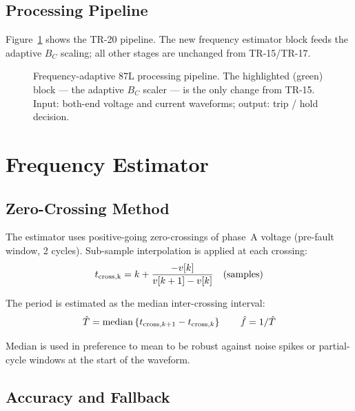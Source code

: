 \documentclass[11pt, a4paper]{article}
\begin{document}
\subsection{Processing Pipeline}

Figure~\ref{fig:pipeline} shows the TR-20 pipeline.  The new frequency
estimator block feeds the adaptive $B_C$ scaling; all other stages are
unchanged from TR-15/TR-17.

\begin{figure}[h]
  \centering
  \resizebox{\textwidth}{!}{}
  \caption{Frequency-adaptive 87L processing pipeline.  The highlighted
           (green) block --- the adaptive $B_C$ scaler --- is the only change
           from TR-15.  Input: both-end voltage and current waveforms;
           output: trip / hold decision.}
  \label{fig:pipeline}
\end{figure}


\section{Frequency Estimator}
\label{sec:estimator}

\subsection{Zero-Crossing Method}

The estimator uses positive-going zero-crossings of phase~A voltage
(pre-fault window, 2 cycles).  Sub-sample interpolation is applied at each
crossing:
\begin{equation}
  t_{\rm cross,k} = k + \frac{-v[k]}{v[k+1]-v[k]}
  \quad \text{(samples)}
\end{equation}

The period is estimated as the median inter-crossing interval:
\begin{equation}
  \hat{T} = \mathrm{median}\left\{t_{{\rm cross},k+1} - t_{{\rm cross},k}\right\}
  \qquad \hat{f} = 1/\hat{T}
\end{equation}

Median is used in preference to mean to be robust against noise spikes or
partial-cycle windows at the start of the waveform.

\subsection{Accuracy and Fallback}
\end{document}

